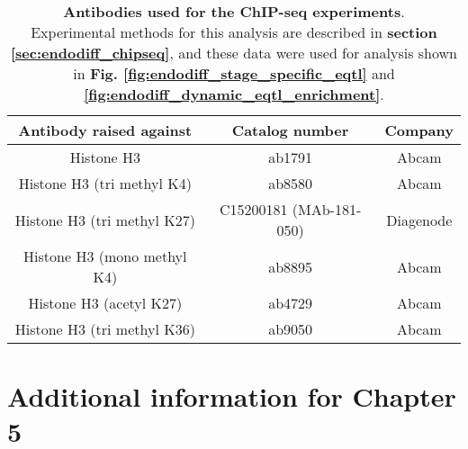 \begin{table}[h]
    \centering
    \begin{tabular}{c c c}
     Antibody raised against & Catalog number & Company  \\
    \hline
    Histone H3 & ab1791 & Abcam \\
    Histone H3 (tri methyl K4) & ab8580 & Abcam \\
    Histone H3 (tri methyl K27) & C15200181 (MAb-181-050)
 & Diagenode\\
    Histone H3 (mono methyl K4) & ab8895 & Abcam \\
    Histone H3 (acetyl K27) & ab4729 & Abcam \\
    Histone H3 (tri methyl K36) & ab9050 & Abcam \\
    \end{tabular}
    \caption[Antibodies used for ChIP-seq experiments]{\textbf{Antibodies used for the ChIP-seq experiments}.\\
    Experimental methods for this analysis are described in \textbf{section \ref{sec:endodiff_chipseq}}, and these data were used for analysis shown in \textbf{Fig. \ref{fig:endodiff_stage_specific_eqtl}} and \textbf{\ref{fig:endodiff_dynamic_eqtl_enrichment}}.} 
    \label{tab:endodiff_chipseq_antibodies}
\end{table}

\clearpage

\section{Additional information for Chapter 5}

